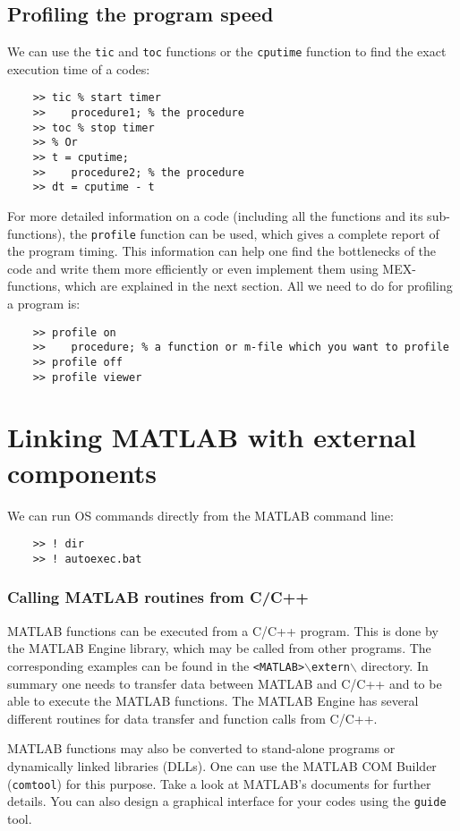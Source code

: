 \documentclass[10pt,a4paper]{article}
\newcounter{example}[section]
\begin{document}
\subsection{Profiling the program speed}
We can use the \texttt{tic} and \texttt{toc} functions or the \texttt{cputime} function to find the exact execution time of a codes:
\begin{lstlisting}
	>> tic % start timer
	>> 	  procedure1; % the procedure
	>> toc % stop timer
	>> % Or
	>> t = cputime;
	>> 	  procedure2; % the procedure
	>> dt = cputime - t
\end{lstlisting}
For more detailed information on a code (including all the functions and its sub-functions), the \texttt{profile} function can be used, which gives a complete report of the program timing. This information can help one find the bottlenecks of the code and write them more efficiently or even implement them using MEX-functions, which are explained in the next section. All we need to do for profiling a program is:
\begin{lstlisting}
	>> profile on
	>> 	  procedure; % a function or m-file which you want to profile
	>> profile off
	>> profile viewer
\end{lstlisting}
\section{Linking MATLAB with external components}
We can run OS commands directly from the MATLAB command line:
\begin{lstlisting}
	>> ! dir
	>> ! autoexec.bat
\end{lstlisting}
\subsubsection{Calling MATLAB routines from C/C++}
MATLAB functions can be executed from a C/C++ program. This is done by the MATLAB Engine library, which may be called from other programs. The corresponding examples can be found in the \texttt{<MATLAB>$\backslash$extern$\backslash$} directory. In summary one needs to transfer data between MATLAB and C/C++ and to be able to execute the MATLAB functions. The MATLAB Engine has several different routines for data transfer and function calls from C/C++.

MATLAB functions may also be converted to stand-alone programs or dynamically linked libraries (DLLs). One can use the MATLAB COM Builder (\texttt{comtool}) for this purpose. Take a look at MATLAB's documents for further details. You can also design a graphical interface for your codes using the \texttt{guide} tool.
\end{document}
